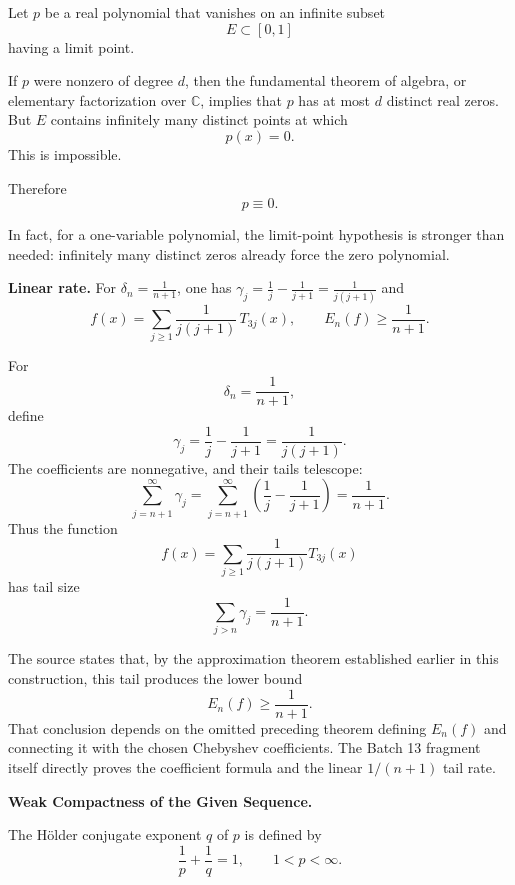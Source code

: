 \begin{solution}
Let \(p\) be a real polynomial that vanishes on an infinite subset
\[
E\subset[0,1]
\]
having a limit point.

If \(p\) were nonzero of degree \(d\), then the fundamental theorem of algebra, or elementary
factorization over \(\mathbb C\), implies that \(p\) has at most \(d\) distinct real zeros.
But \(E\) contains infinitely many distinct points at which
\[
p(x)=0.
\]
This is impossible.

Therefore
\[
\boxed{p\equiv0.}
\]

In fact, for a one-variable polynomial, the limit-point hypothesis is stronger than needed:
infinitely many distinct zeros already force the zero polynomial.
\end{solution}


\begin{problem}[CP-II-0285]
\label{prob:cp-ii-0285}
\textbf{Linear rate.}
	For $\delta_n=\frac{1}{n+1}$, one has
	$\gamma_j=\frac{1}{j}-\frac{1}{j+1}=\frac{1}{j(j+1)}$ and
	\[
	f(x)=\sum_{j\ge1}\frac{1}{j(j+1)}\,T_{3j}(x),
	\qquad E_n(f)\ge\frac{1}{n+1}.
	\]
\end{problem}

\begin{solution}
For
\[
\delta_n=\frac1{n+1},
\]
define
\[
\gamma_j
=
\frac1j-\frac1{j+1}
=
\frac1{j(j+1)}.
\]
The coefficients are nonnegative, and their tails telescope:
\[
\sum_{j=n+1}^{\infty}\gamma_j
=
\sum_{j=n+1}^{\infty}
\left(
\frac1j-\frac1{j+1}
\right)
=
\frac1{n+1}.
\]
Thus the function
\[
f(x)
=
\sum_{j\ge1}
\frac1{j(j+1)}T_{3j}(x)
\]
has tail size
\[
\boxed{
\sum_{j>n}\gamma_j
=
\frac1{n+1}.
}
\]

The source states that, by the approximation theorem established earlier in this construction,
this tail produces the lower bound
\[
\boxed{
E_n(f)\ge\frac1{n+1}.
}
\]
That conclusion depends on the omitted preceding theorem defining \(E_n(f)\) and connecting
it with the chosen Chebyshev coefficients. The Batch 13 fragment itself directly proves the
coefficient formula and the linear \(1/(n+1)\) tail rate.
\end{solution}


\begin{problem}[CP-II-0287]
\label{prob:cp-ii-0287}
\textbf{Weak Compactness of the Given Sequence.}

\hspace*{1.5em}The Hölder conjugate exponent $q$ of $p$ is defined by
	\[
	\frac{1}{p} + \frac{1}{q} = 1,
	\qquad 1 < p < \infty.
	\]
\end{problem}

